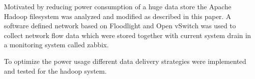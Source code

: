 Motivated by reducing power consumption of a huge data store the Apache Hadoop\textsuperscript{\textregistered} filesystem was analyzed and modified as described in this paper. 
A software defined network based on Floodlight and Open vSwitch was used to collect network flow data which were stored together with current system drain in a monitoring system called zabbix.

To optimize the power usage different data delivery strategies were implemented and tested for the hadoop system.

